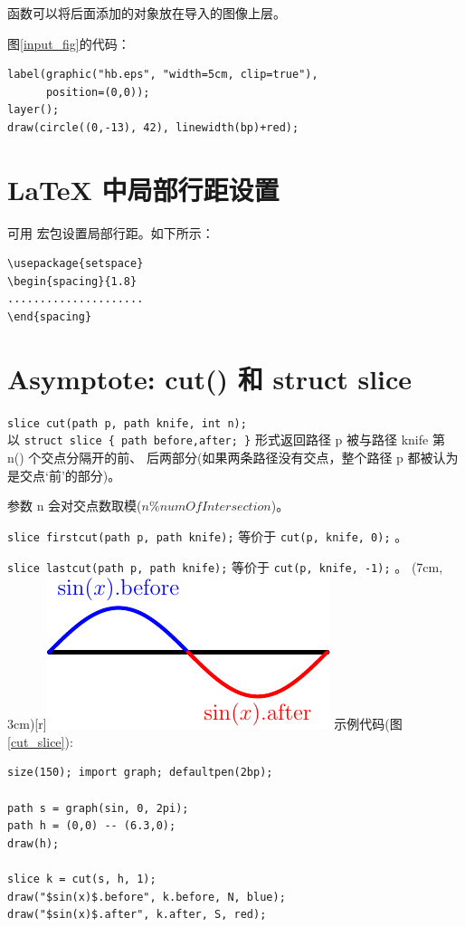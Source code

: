 \documentclass[a4paper,11pt]{article}
\begin{document}
 函数可以将后面添加的对象放在导入的图像上层。

图\ref{input_fig}的代码：
\begin{Verbatim}
label(graphic("hb.eps", "width=5cm, clip=true"),
      position=(0,0));
layer();
draw(circle((0,-13), 42), linewidth(bp)+red);
\end{Verbatim}

%

\section{\LaTeX{} 中局部行距设置}
可用  宏包设置局部行距。如下所示：
\begin{Verbatim}
\usepackage{setspace}
\begin{spacing}{1.8}
.....................
\end{spacing}
\end{Verbatim}

\section{Asymptote: cut() 和 struct slice}
\verb+slice cut(path p, path knife, int n);+\\
以 \verb+struct slice { path before,after; }+ 形式返回路径 p
被与路径 knife 第 n() 个交点分隔开的前、
后两部分(如果两条路径没有交点，整个路径 p 都被认为是交点`前'的部分)。

参数 n 会对交点数取模($n \% numOfIntersection$)。

\verb+slice firstcut(path p, path knife);+
等价于 \verb+cut(p, knife, 0);+ 。

\verb+slice lastcut(path p, path knife);+
等价于 \verb+cut(p, knife, -1);+ 。
\parpic(7cm, 3cm)[r]{\includegraphics{./figs/cut_slice.pdf}}
示例代码(图\ref{cut_slice}):
\begin{Verbatim}
size(150); import graph; defaultpen(2bp);

path s = graph(sin, 0, 2pi);
path h = (0,0) -- (6.3,0);
draw(h);

slice k = cut(s, h, 1);
draw("$sin(x)$.before", k.before, N, blue);
draw("$sin(x)$.after", k.after, S, red);
\end{Verbatim}
\end{document}
